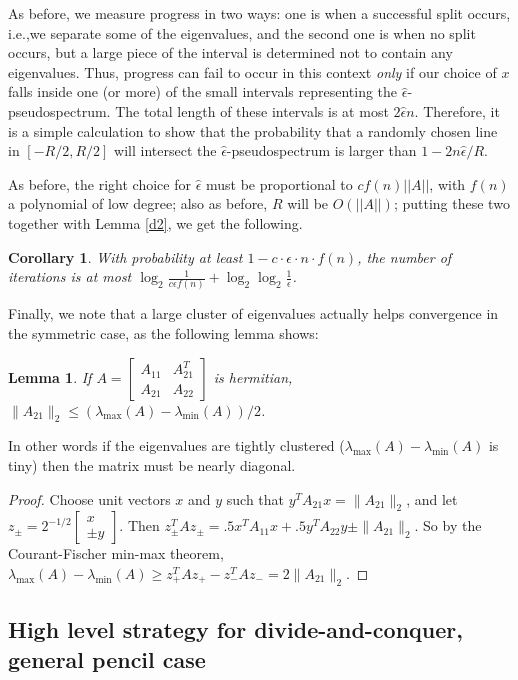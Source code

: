\documentclass{article}
\newcommand{\bmat}{\left[ \begin{array}}
\newcommand{\emat}{\end{array} \right]}
\newtheorem{lemma}[theorem]{Lemma}
\newtheorem{corollary}[theorem]{Corollary}
\theoremstyle{definition}
\begin{document}
As before, we measure progress in two ways: one is when a successful split occurs, i.e.,we separate some of the eigenvalues, and the second one is when no split occurs, but a large piece of the interval is determined not to contain any eigenvalues. Thus, progress can fail to occur in this context \emph{only} if our choice of $x$ falls inside one (or more) of the small intervals representing the $\hat{\epsilon}$-pseudospectrum. The total length of these intervals is at most $2 \hat{\epsilon} n$. Therefore, it is a simple calculation to show that the probability that a randomly chosen line in $[-R/2, R/2]$ will intersect the $\hat{\epsilon}$-pseudospectrum is larger than $ 1- 2n \hat{\epsilon}/R$. 

As before, the right choice for $\hat{\epsilon}$ must be proportional to 
$c f(n) ||A||$, with $f(n)$ a polynomial of low degree; 
also as before, $R$ will be $O(||A||)$; putting these two together with 
Lemma \ref{d2}, we get the following. 

\begin{corollary} \label{d4} 
With probability at least $1 - c \cdot \epsilon \cdot n \cdot f(n)$, the number of iterations is at most $ \log_2 \frac{1}{c \epsilon f(n)} + \log_2 \log_2 \frac{1}{\epsilon}$.
\end{corollary}

Finally, we note that a large cluster of eigenvalues actually helps convergence in the symmetric case, 
as the following lemma shows:

\begin{lemma} If $A = \bmat{cc} A_{11} & A_{21}^T \\ A_{21} & A_{22} \emat$ is hermitian, 
$\|A_{21}\|_2 \leq (\lambda_{\max}(A) - \lambda_{\min}(A))/2$.
\end{lemma}
In other words if the eigenvalues are tightly clustered 
($\lambda_{\max}(A) - \lambda_{\min}(A)$ is tiny) then the 
matrix must be nearly diagonal.
\begin{proof}
Choose unit vectors $x$ and $y$ such that $y^T A_{21} x = \| A_{21} \|_2$,
and let $z_{\pm} = 2^{-1/2} \bmat{c} x \\ \pm y \emat$.
Then $z_{\pm}^T A z_{\pm} = .5 x^T A_{11} x + .5 y^T A_{22} y \pm \|A_{21}\|_2$.
So by the Courant-Fischer min-max theorem,
$\lambda_{\max}(A) - \lambda_{\min}(A) \geq z_+^T A z_+ - z_-^T A z_- = 2\|A_{21}\|_2$.
\end{proof}


\subsection{High level strategy for divide-and-conquer, general pencil case}
\end{document}
